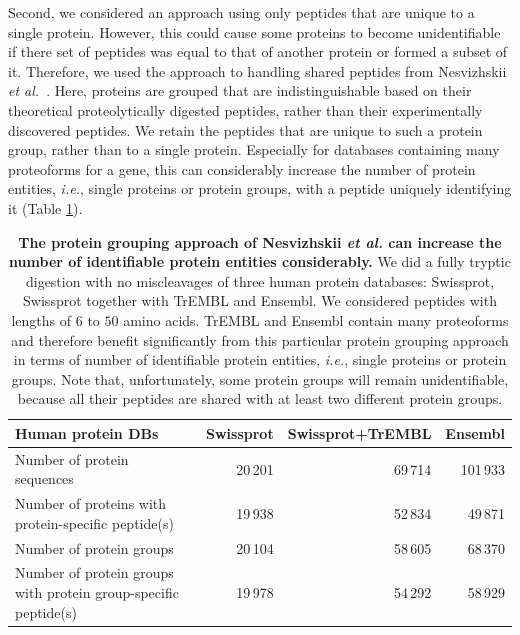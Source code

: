 \documentclass{article}
\begin{document}
Second, we considered an approach using only peptides that are unique
to a single protein. However, this could cause some proteins to become
unidentifiable if there set of peptides was equal to that of another
protein or formed a subset of it. Therefore, we used the approach to
handling shared peptides from Nesvizhskii {\em et
al.}~\cite{nesvizhskii2003statistical}. Here, proteins are grouped
that are indistinguishable based on their theoretical proteolytically
digested peptides, rather than their experimentally discovered
peptides. We retain the peptides that are unique to such a protein
group, rather than to a single protein. Especially for databases
containing many proteoforms for a gene, this can considerably increase
the number of protein entities, {\em i.e.}, single proteins or protein
groups, with a peptide uniquely identifying it (Table
\ref{tab:duplicate-proteins}).

\begin{table}[!htp]
  \begin{center}
  
\begin{tabular}{|l|r|r|r|}
\hline
Human protein DBs & Swissprot & Swissprot+TrEMBL & Ensembl\\
\hline
Number of protein sequences & 20\,201 & 69\,714 & 101\,933\\
\hline
Number of proteins with protein-specific peptide(s) & 19\,938 & 52\,834 &
49\,871\\
\hline
Number of protein groups & 20\,104 & 58\,605 & 68\,370\\
\hline
Number of protein groups with protein group-specific peptide(s) & 19\,978 &
54\,292 & 58\,929\\
\hline
\end{tabular}

  \end{center}
  \caption{\label{tab:duplicate-proteins}\textbf{The protein grouping
approach of Nesvizhskii {\em et al.} can increase the number of
identifiable protein entities considerably.} We did a fully tryptic
digestion with no miscleavages of three human protein databases:
Swissprot, Swissprot together with TrEMBL and Ensembl. We considered
peptides with lengths of $6$ to $50$ amino acids. TrEMBL and Ensembl
contain many proteoforms and therefore benefit significantly from this
particular protein grouping approach in terms of number of
identifiable protein entities, {\em i.e.}, single proteins or protein
groups. Note that, unfortunately, some protein groups will remain
unidentifiable, because all their peptides are shared with at least
two different protein groups.}
\end{table}
\end{document}
